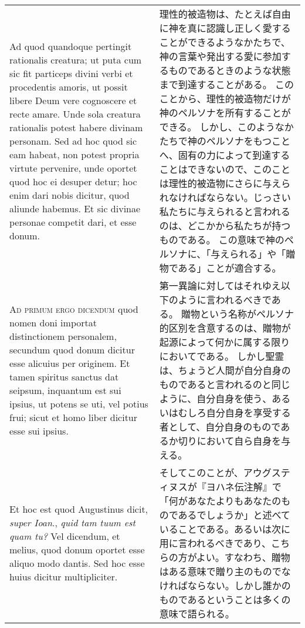 \documentclass[10pt]{jsarticle} %
\begin{document}
\begin{longtable}{p{21em}p{21em}}
\\

Ad quod quandoque pertingit
rationalis creatura; ut puta cum sic fit particeps divini verbi et procedentis
amoris, ut possit libere Deum vere cognoscere et recte amare. Unde sola
creatura rationalis potest habere divinam personam. Sed ad hoc quod sic eam
habeat, non potest propria virtute pervenire, unde oportet quod hoc ei desuper
detur; hoc enim dari nobis dicitur, quod aliunde habemus. Et sic divinae
personae competit dari, et esse donum.


&

理性的被造物は、たとえば自由に神を真に認識し正しく愛することができるようなかたちで、神の言葉や発出する愛に参加するものであるときのような状態まで到達することがある。
このことから、理性的被造物だけが神のペルソナを所有することができる。
しかし、このようなかたちで神のペルソナをもつことへ、固有の力によって到達することはできないので、このことは理性的被造物にさらに与えられなければならない。じっさい私たちに与えられると言われるのは、どこかから私たちが持つものである。
この意味で神のペルソナに、「与えられる」や「贈物である」ことが適合する。

\\

\textsc{Ad primum ergo dicendum} quod nomen doni importat distinctionem personalem,
secundum quod donum dicitur esse alicuius per originem. Et tamen spiritus
sanctus dat seipsum, inquantum est sui ipsius, ut potens se uti, vel potius
frui; sicut et homo liber dicitur esse sui ipsius. 



&

第一異論に対してはそれゆえ以下のように言われるべきである。
贈物という名称がペルソナ的区別を含意するのは、贈物が起源によって何かに属する限りにおいてである。
しかし聖霊は、ちょうど人間が自分自身のものであると言われるのと同じように、自分自身を使う、あるいはむしろ自分自身を享受する者として、自分自身のものであるか切りにおいて自ら自身を与える。

\\



Et hoc est quod Augustinus
dicit, \textit{super Ioan}., \textit{quid tam tuum est quam tu?} Vel dicendum, et melius, quod
donum oportet esse aliquo modo dantis. Sed hoc esse huius dicitur
multipliciter. 



&

そしてこのことが、アウグスティヌスが『ヨハネ伝注解』で「何があなたよりもあなたのものであるでしょうか」と述べていることである。あるいは次に用に言われるべきであり、こちらの方がよい。すなわち、贈物はある意味で贈り主のものでなければならない。しかし誰かのものであるということは多くの意味で語られる。


\end{longtable}
\end{document}
